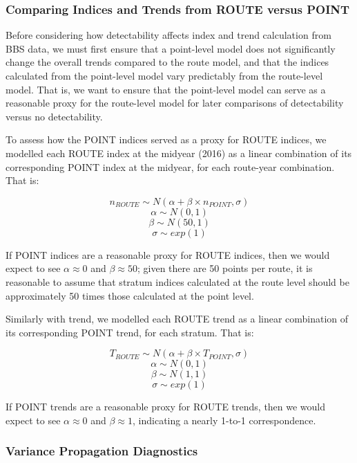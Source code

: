 \documentclass[12pt]{article}
\begin{document}
\subsubsection{Comparing Indices and Trends from ROUTE versus POINT}\label{route-vs-point}

\par Before considering how detectability affects index and trend calculation from BBS data, we must first ensure that a point-level model does not significantly change the overall trends compared to the route model, and that the indices calculated from the point-level model vary predictably from the route-level model.
That is, we want to ensure that the point-level model can serve as a reasonable proxy for the route-level model for later comparisons of detectability versus no detectability.

\par To assess how the POINT indices served as a proxy for ROUTE indices, we modelled each ROUTE index at the midyear (2016) as a linear combination of its corresponding POINT index at the midyear, for each route-year combination. 
That is:

$$	n_{ROUTE} \sim N(\alpha + \beta \times n_{POINT}, \sigma) $$
$$	\alpha \sim N(0,1) $$
$$	\beta \sim N(50, 1) $$
$$	\sigma \sim exp(1)$$

If POINT indices are a reasonable proxy for ROUTE indices, then we would expect to see $\alpha \approx 0$ and $\beta \approx 50$; given there are 50 points per route, it is reasonable to assume that stratum indices calculated at the route level should be approximately 50 times those calculated at the point level.

\par Similarly with trend, we modelled each ROUTE trend as a linear combination of its corresponding POINT trend, for each stratum.
That is:

$$ T_{ROUTE} \sim N(\alpha + \beta \times T_{POINT}, \sigma)$$
$$ \alpha \sim N(0,1) $$
$$ \beta \sim N(1,1) $$
$$ \sigma \sim exp(1) $$

If POINT trends are a reasonable proxy for ROUTE trends, then we would expect to see $\alpha \approx 0$ and $\beta \approx 1$, indicating a nearly 1-to-1 correspondence. 

\subsubsection{Variance Propagation Diagnostics}
\end{document}
